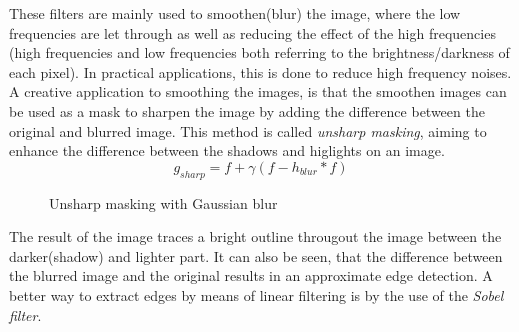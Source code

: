 \documentclass[twoside,a4paper,article]{combine}
\begin{document}
These filters are mainly used to smoothen(blur) the image, where the low frequencies are let through as well as reducing the effect of the high frequencies (high frequencies and low frequencies both referring to
the brightness/darkness of each pixel). In practical applications, this is done to reduce high frequency noises.
A creative application to smoothing the images, is that the smoothen images can be used as a mask to sharpen the image by adding the difference between the original and blurred image.
This method is called \emph{unsharp masking}, aiming to enhance the difference between the shadows and higlights on an image\cite{Szeliski_2022}.
\[
  g_{sharp} = f + \gamma(f - h_{blur} \ast f)  
\]
\begin{minipage}{\textwidth}\begin{figure}[H]
    \centering
    \caption{Unsharp masking with Gaussian blur}\label{fig:unsharp_mask}
\end{figure}\end{minipage}
The result of the image traces a bright outline througout the image between the darker(shadow) and lighter part. It can also be seen, that
the difference between the blurred image and the original results in an approximate edge detection. A better way to extract edges by means of linear filtering is
by the use of the \emph{Sobel filter}. \cite{Szeliski_2022}
\end{document}
